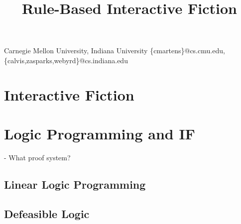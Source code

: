 \documentclass[computermodern]{sigplanconf}
\begin{document}


\title{Rule-Based Interactive Fiction}


           {Carnegie Mellon University, Indiana University}
           {\{cmartens\}@cs.cmu.edu,\{calvis,zasparks,webyrd\}@cs.indiana.edu}

\maketitle

\section{Interactive Fiction}



\section{Logic Programming and IF}



- What proof system?

\subsection{Linear Logic Programming}



\subsection{Defeasible Logic}



\nocite{Covington:1996:PPD:230996}
\nocite{apt03principles}
\nocite{Marriottp98Pwc}

%


\end{document}
